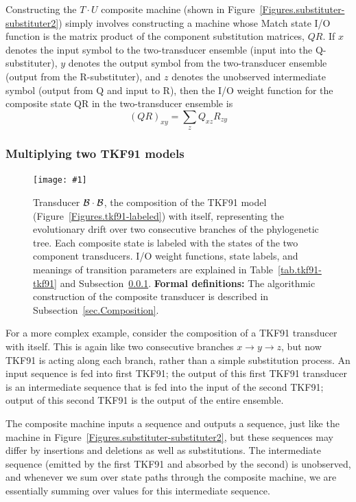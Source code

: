 \documentclass{article}
\newcommand{\secref}[1]{Subsection~\ref{sec.#1}}
\newcommand{\seclabel}[1]{\label{sec.#1}}
\newcommand{\tabnum}[1]{\ref{tab.#1}}
\newcommand{\tabref}[1]{Table~\tabnum{#1}}
\newcommand{\figref}[1]{Figure~\ref{Figures.#1}}
\newcommand{\figlabel}[1]{\label{Figures.#1}}
\newcommand{\easyfig}[4]{
\begin{figure}
\texttt{[image: \#1]}
\caption{ \figlabel{#3} #4}
\end{figure}}
\newcommand{\widepdffig}[2]{\easyfig{#1-fig.pdf}{width=\textwidth}{#1}{#2}}
\newcommand\tkf{{\cal B}}
\newcommand\formaldefs{{\bf Formal definitions: }}
\begin{document}
Constructing the $T \cdot U$ composite machine 
 (shown in \figref{substituter-substituter2})
simply involves constructing a machine whose Match state I/O function
 is the matrix product of the component substitution matrices, $QR$.  
If $x$ denotes the input symbol to the two-transducer ensemble (input into the Q-substituter),
$y$ denotes the output symbol from the two-transducer ensemble (output from the R-substituter),
and $z$ denotes the unobserved intermediate symbol (output from Q and input to R),
then the I/O weight function for the composite state QR in the two-transducer ensemble is
\[
(QR)_{xy} = \sum_z Q_{xz} R_{zy}
\]



\subsubsection{Multiplying two TKF91 models}
\seclabel{tkf91-tkf91}

\widepdffig{tkf91-tkf91}{Transducer $\tkf \cdot \tkf$, the composition of the 
TKF91 model (\figref{tkf91-labeled}) with itself, representing the evolutionary drift
 over two consecutive branches of the phylogenetic tree.
Each composite state is labeled with the states of the two component transducers.  
I/O weight functions, state labels, and meanings of transition parameters are explained
in \tabref{tkf91-tkf91} and \secref{tkf91-tkf91}.
\formaldefs
The algorithmic construction of the composite transducer is described in \secref{Composition}.
}

For a more complex example, consider the composition of a TKF91 transducer with itself.  
This is again like two consecutive branches $x \to y \to z$, 
but now TKF91 is acting along each branch, rather than a simple substitution process. 
An input sequence is fed into first TKF91; 
the output of this first TKF91 transducer is an intermediate sequence
 that is fed into the input of the second TKF91;
output of this second TKF91 is the output of the entire ensemble.

The composite machine inputs a sequence and outputs a sequence, just like the machine
in  \figref{substituter-substituter2}, but these sequences may differ by insertions and deletions
as well as substitutions. 
The intermediate sequence (emitted by the first TKF91 and absorbed by the second) is unobserved,
and whenever we sum over state paths through the composite machine, we are essentially summing over
values for this intermediate sequence. 
\end{document}
